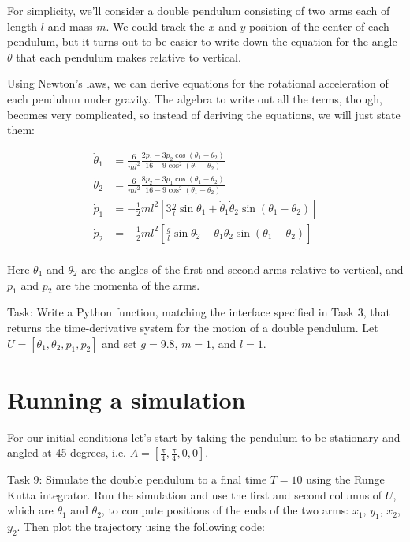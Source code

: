 \documentclass[main.tex]{subfiles}
\begin{document}
For simplicity, we'll consider a double pendulum consisting of two arms each of length $l$ and mass $m$.  
We could track the $x$ and $y$ position of the center of each pendulum, but it turns out to be easier to write down the equation for the angle $\theta$ that each pendulum makes relative to vertical.

Using Newton's laws, we can derive equations for the rotational acceleration of each pendulum under gravity.  
The algebra to write out all the terms, though, becomes very complicated, so instead of deriving the equations, we will just state them:

\begin{align}
    \dot{\theta}_1 &= \frac{6}{m l^2} \frac{2 p_1 - 3 p_2 \cos(\theta_1-\theta_2)}{16 - 9 \cos^2(\theta_1-\theta_2)} \\
    \dot{\theta}_2 &= \frac{6}{m l^2} \frac{8 p_2 - 3 p_1 \cos(\theta_1-\theta_2)}{16 - 9 \cos^2(\theta_1-\theta_2)} \\
    \dot{p}_1 &= -\frac{1}{2} m l^2 [3 \frac{g}{l} \sin \theta_1 + \dot{\theta}_1 \dot{\theta}_2 \sin(\theta_1-\theta_2)] \\
    \dot{p}_2 &= -\frac{1}{2} m l^2 [\frac{g}{l} \sin \theta_2 - \dot{\theta}_1 \dot{\theta}_2 \sin(\theta_1-\theta_2)] \\
\end{align}

Here $\theta_1$ and $\theta_2$ are the angles of the first and second arms relative to vertical, and $p_1$ and $p_2$ are the momenta of the arms.

Task: 
Write a Python function, matching the interface specified in Task 3, that returns the time-derivative system for the motion of a double pendulum.  
Let $U = [\theta_1, \theta_2, p_1, p_2]$ and set $g=9.8$, $m=1$, and $l=1$.

\section{Running a simulation}

For our initial conditions let's start by taking the pendulum to be stationary and angled at 45 degrees, i.e. $A = [\frac{\pi}{4}, \frac{\pi}{4}, 0, 0]$.

Task 9: 
Simulate the double pendulum to a final time $T=10$ using the Runge Kutta integrator.  
Run the simulation and use the first and second columns of $U$, which are $\theta_1$ and $\theta_2$, to compute positions of the ends of the two arms: $x_1$, $y_1$, $x_2$, $y_2$.  
Then plot the trajectory using the following code:
\end{document}
